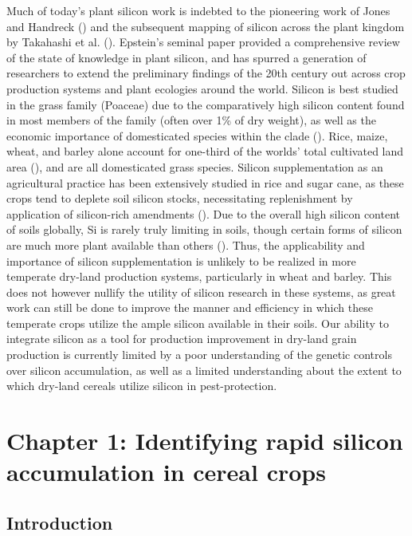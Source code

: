 \documentclass[12pt, letterpaper, ]{article}
\begin{document}
Much of today’s plant silicon work is indebted to the pioneering work of Jones and Handreck (\citeyear{jones_silica_1967}) and the subsequent mapping of silicon across the plant kingdom by Takahashi et al. (\citeyear{takahashi_possibility_1990}). Epstein’s seminal \citeyear{epstein_silicon_1999} paper provided a comprehensive review of the state of knowledge in plant silicon, and has spurred a generation of researchers to extend the preliminary findings of the 20th century out across crop production systems and plant ecologies around the world. Silicon is best studied in the grass family (Poaceae) due to the comparatively high silicon content found in most members of the family (often over 1\% of dry weight), as well as the economic importance of domesticated species within the clade (\cite{reynolds_silicon_2016}). Rice, maize, wheat, and barley alone account for one-third of the worlds’ total cultivated land area (\cite{faostat}), and are all domesticated grass species. Silicon supplementation as an agricultural practice has been extensively studied in rice and sugar cane, as these crops tend to deplete soil silicon stocks, necessitating replenishment by application of silicon-rich amendments (\cite{haynes_contemporary_2014,meena_case_2014}). Due to the overall high silicon content of soils globally, Si is rarely truly limiting in soils, though certain forms of silicon are much more plant available than others (\cite{fraysse_surface_2009}). Thus, the applicability and importance of silicon supplementation is unlikely to be realized in more temperate dry-land production systems, particularly in wheat and barley. This does not however nullify the utility of silicon research in these systems, as great work can still be done to improve the manner and efficiency in which these temperate crops utilize the ample silicon available in their soils. Our ability to integrate silicon as a tool for production improvement in dry-land grain production is currently limited by a poor understanding of the genetic controls over silicon accumulation, as well as a limited understanding about the extent to which dry-land cereals utilize silicon in pest-protection. 

\section{Chapter 1: Identifying rapid silicon accumulation in cereal crops}

\subsection{Introduction}
\end{document}
